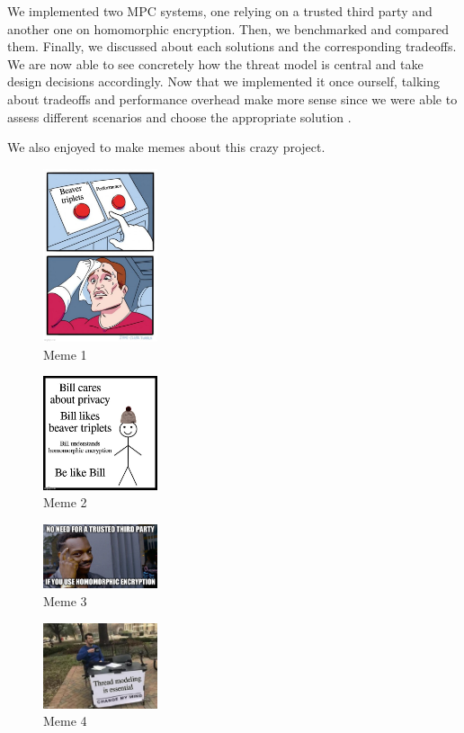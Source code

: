 \documentclass[10pt,conference]{IEEEtran}
\begin{document}
We implemented two MPC systems, one relying on a trusted third party and another one on homomorphic encryption. Then, we benchmarked and compared them. Finally, we discussed about each solutions and the corresponding tradeoffs. We are now able to see concretely how the threat model is central and take design decisions accordingly. Now that we implemented it once ourself, talking about tradeoffs and performance overhead make more sense since we were able to assess different scenarios and choose the appropriate solution .

\newpage
We also enjoyed to make memes about this crazy project.
\begin{figure}[h]
  \caption{Meme 1}
  \includegraphics[width=0.3\textwidth]{pets_meme_1.jpg}
\end{figure}
\begin{figure}[h]
  \caption{Meme 2}
  \includegraphics[width=0.3\textwidth]{pets_meme_2.jpg}
\end{figure}
\begin{figure}[h]
  \caption{Meme 3}
  \includegraphics[width=0.3\textwidth]{pets_meme_3.jpg}
\end{figure}
\begin{figure}[h]
  \caption{Meme 4}
  \includegraphics[width=0.3\textwidth]{pets_meme_4.jpg}
\end{figure}
\end{document}
